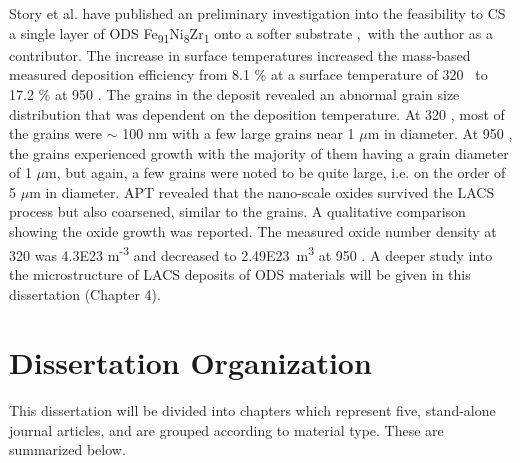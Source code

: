 		Story et al. have published an preliminary investigation into the feasibility to CS a single layer of ODS Fe\textsubscript{91}Ni\textsubscript{8}Zr\textsubscript{1 }onto a softer substrate \cite{RN383},\ with the author as a contributor. The increase in surface temperatures increased the mass-based measured deposition efficiency from 8.1 $\%$  at a surface temperature of 320 \celsius{} to 17.2 $\%$  at 950 \celsius{}. The grains in the deposit revealed an abnormal grain size distribution that was dependent on the deposition temperature.  At 320 \celsius{}, most of the grains were $ \sim $ 100 nm with a few large grains near 1 $ \mu $m in diameter. At 950 \celsius{}, the grains experienced growth with the majority of them having a grain diameter of 1 $ \mu $m, but again, a few grains were noted to be quite large, i.e. on the order of 5 $ \mu $m in diameter. APT revealed that the nano-scale oxides survived the LACS process but also coarsened, similar to the grains. A qualitative comparison showing the oxide growth was reported. The measured oxide number density at 320 \celsius{} was 4.3E23 m\textsuperscript{-3} and decreased to 2.49E23 m\textsuperscript{3 }at 950 \celsius{}. A deeper study into the microstructure of LACS deposits of ODS materials will be given in this dissertation (Chapter 4). 



\section*{Dissertation Organization}
	
	

	
	This dissertation will be divided into chapters which represent five, stand-alone journal articles, and are grouped according to material type. These are summarized below. 
	
